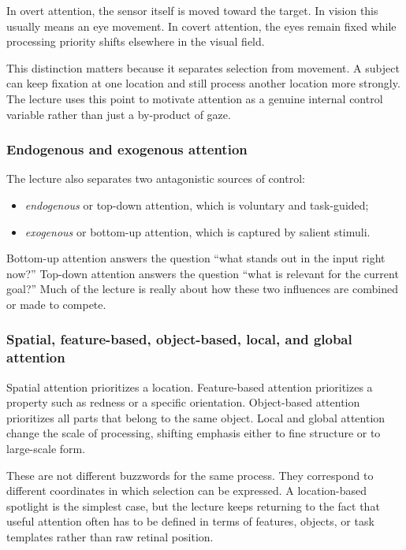 In overt attention, the sensor itself is moved toward the target. In vision this usually means an eye movement. In covert attention, the eyes remain fixed while processing priority shifts elsewhere in the visual field.

This distinction matters because it separates selection from movement. A subject can keep fixation at one location and still process another location more strongly. The lecture uses this point to motivate attention as a genuine internal control variable rather than just a by-product of gaze.

\subsubsection{Endogenous and exogenous attention}

The lecture also separates two antagonistic sources of control:
\begin{itemize}
    \item \emph{endogenous} or top-down attention, which is voluntary and task-guided;
    \item \emph{exogenous} or bottom-up attention, which is captured by salient stimuli.
\end{itemize}

Bottom-up attention answers the question ``what stands out in the input right now?'' Top-down attention answers the question ``what is relevant for the current goal?'' Much of the lecture is really about how these two influences are combined or made to compete.

\subsubsection{Spatial, feature-based, object-based, local, and global attention}

Spatial attention prioritizes a location. Feature-based attention prioritizes a property such as redness or a specific orientation. Object-based attention prioritizes all parts that belong to the same object. Local and global attention change the scale of processing, shifting emphasis either to fine structure or to large-scale form.

These are not different buzzwords for the same process. They correspond to different coordinates in which selection can be expressed. A location-based spotlight is the simplest case, but the lecture keeps returning to the fact that useful attention often has to be defined in terms of features, objects, or task templates rather than raw retinal position.

